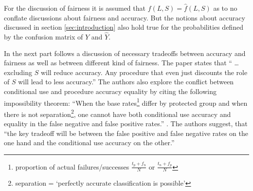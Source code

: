 
For the discussion of fairness it is assumed that $f(L,S) = \hat{f}(L,S)$ as to no 
conflate discussions about fairness and accuracy. But the notions about accuracy discussed 
in section \ref{sec:introduction} also hold true for the probabilities defined by the
confusion matrix of $Y$ and $\hat{Y}$. 

In the next part follows a discussion of necessary tradeoffs between accuracy and 
fairness as well as between different kind of fairness. The paper states that \enquote{
\dots excluding $S$ will reduce accuracy. Any procedure that even just discounts the role 
of $S$ will lead to less accuracy.}\cite{Berk.2018} The authors also explore the conflict 
between conditional use and procedure accuracy equality by citing the following impossibility 
theorem: \enquote{When the base rates\footnote{ proportion of actual failures/successes 
$\frac{t_p + f_n}{N}$ or $\frac{t_n + f_p}{N}$} differ by protected group and when there 
is not separation\footnote{ separation = \enquote{perfectly accurate classification is
possible}\cite{Berk.2018}}, one cannot have both conditional use accuracy and equality in 
the false negative and false positive rates.}\cite{DBLP:journals/corr/KleinbergMR16}
\cite{Chouldechova2017FairPW}. The authors suggest, that \enquote{the key tradeoff will be 
between the false positive and false negative rates on the one hand and the conditional use 
accuracy on the other.}\cite{Berk.2018}


